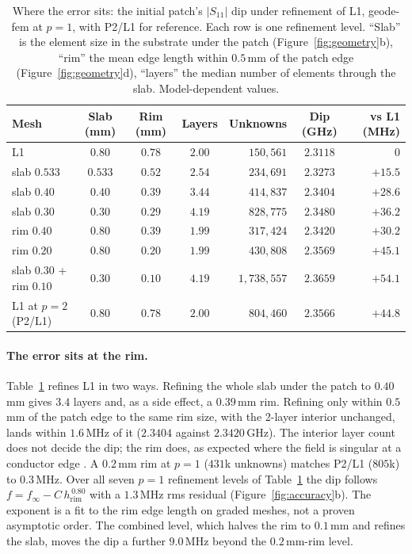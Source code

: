 \documentclass{anvil-paper}
\newcommand{\PL}{P2/L1}
\begin{document}
\begin{table}[t]
  \centering
  \caption{Where the error sits: the initial patch's $|S_{11}|$ dip under
  refinement of L1, geode-fem at $p = 1$, with \PL{} for reference. Each row
  is one refinement level. ``Slab'' is the element size in the substrate
  under the patch (Figure~\ref{fig:geometry}b), ``rim'' the mean edge length
  within $0.5$\,mm of the patch edge (Figure~\ref{fig:geometry}d), ``layers''
  the median number of elements through the slab. Model-dependent values.}
  \label{tab:x1}
  \small
  \begin{tabular}{@{}l c c c r c r@{}}
    \toprule
    Mesh & Slab (mm) & Rim (mm) & Layers & Unknowns & Dip (GHz) & vs L1 (MHz) \\
    \midrule
    L1 & $0.80$ & $0.78$ & $2.00$ & $150{,}561$ & $2.3118$ & $0$ \\
    slab $0.533$ & $0.533$ & $0.52$ & $2.54$ & $234{,}691$ & $2.3273$ & $+15.5$ \\
    slab $0.40$ & $0.40$ & $0.39$ & $3.44$ & $414{,}837$ & $2.3404$ & $+28.6$ \\
    slab $0.30$ & $0.30$ & $0.29$ & $4.19$ & $828{,}775$ & $2.3480$ & $+36.2$ \\
    rim $0.40$ & $0.80$ & $0.39$ & $1.99$ & $317{,}424$ & $2.3420$ & $+30.2$ \\
    rim $0.20$ & $0.80$ & $0.20$ & $1.99$ & $430{,}808$ & $2.3569$ & $+45.1$ \\
    slab $0.30$ + rim $0.10$ & $0.30$ & $0.10$ & $4.19$ & $1{,}738{,}557$ & $2.3659$ & $+54.1$ \\
    \midrule
    L1 at $p = 2$ (\PL) & $0.80$ & $0.78$ & $2.00$ & $804{,}460$ & $2.3566$ & $+44.8$ \\
    \bottomrule
  \end{tabular}
\end{table}

\paragraph{The error sits at the rim.}
Table~\ref{tab:x1} refines L1 in two ways. Refining the whole slab under the
patch to $0.40$\,mm gives $3.4$ layers and, as a side effect, a $0.39$\,mm
rim. Refining only within $0.5$\,mm of the patch edge to the same rim size,
with the 2-layer interior unchanged, lands within $1.6$\,MHz of it
($2.3404$ against $2.3420$\,GHz). The interior layer count does not decide
the dip; the rim does, as expected where the field is singular at a
conductor edge \citep{meixner1972behavior}. A $0.2$\,mm rim at $p = 1$
($431$k unknowns) matches \PL{} ($805$k) to $0.3$\,MHz. Over all seven
$p = 1$ refinement levels of Table~\ref{tab:x1} the dip follows $f = f_\infty - C\,h_{\mathrm{rim}}^{\,0.80}$
with a $1.3$\,MHz rms residual (Figure~\ref{fig:accuracy}b). The exponent is
a fit to the rim edge length on graded meshes, not a proven
asymptotic order. The combined level, which halves the rim to $0.1$\,mm and
refines the slab, moves the dip a further $9.0$\,MHz beyond the
$0.2$\,mm-rim level.
\end{document}
